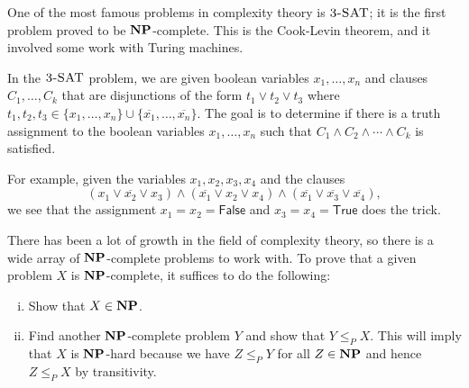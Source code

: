 One of the most famous problems in complexity theory is $\textsc{3-SAT}$; 
it is the first problem proved to be $\mathbf{NP}$-complete. This is the 
Cook-Levin theorem, and it involved some work with Turing machines. 

In the $\textsc{3-SAT}$ problem, we are given boolean variables $x_1, \dots, x_n$ and clauses 
$C_1, \dots, C_k$ that are disjunctions of the form $t_1 \vee t_2 \vee t_3$ 
where $t_1, t_2, t_3 \in \{x_1, \dots, x_n\} \cup \{\overline{x_1}, \dots, \overline{x_n}\}$. 
The goal is to determine if there is a truth assignment to the boolean variables 
$x_1, \dots, x_n$ such that $C_1 \wedge C_2 \wedge \cdots \wedge C_k$ is satisfied. 

For example, given the variables $x_1, x_2, x_3, x_4$ and the clauses 
\[ (x_1 \vee \overline{x_2} \vee x_3) \wedge (\overline{x_1} \vee x_2 \vee x_4) 
\wedge (\overline{x_1} \vee \overline{x_3} \vee \overline{x_4}), \] 
we see that the assignment $x_1 = x_2 = \textsf{False}$ and 
$x_3 = x_4 = \textsf{True}$ does the trick. 

There has been a lot of growth in the field of complexity theory, so 
there is a wide array of $\mathbf{NP}$-complete problems to work with. 
To prove that a given problem $X$ is $\mathbf{NP}$-complete, it suffices 
to do the following: 
\begin{enumerate}[(i)]
    \item Show that $X \in \mathbf{NP}$. 
    \item Find another $\mathbf{NP}$-complete problem $Y$ and show that $Y \leq_P X$. 
    This will imply that $X$ is $\mathbf{NP}$-hard because we have $Z \leq_P Y$ for all 
    $Z \in \mathbf{NP}$ and hence $Z \leq_P X$ by transitivity.
\end{enumerate}


